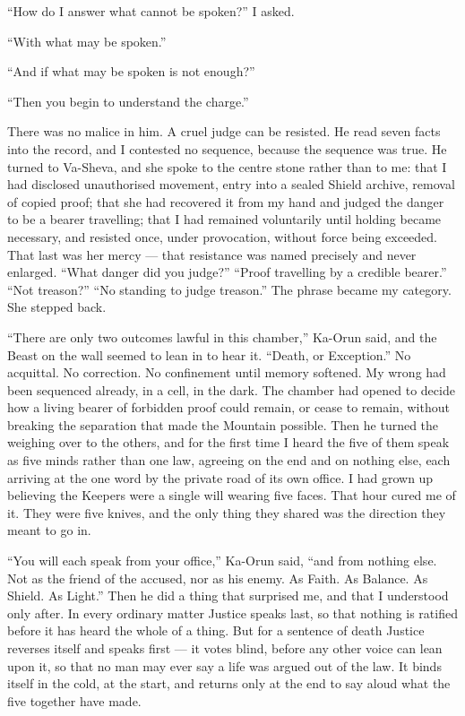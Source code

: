 ``How do I answer what cannot be spoken?'' I asked.\par
 
``With what may be spoken.''\par
 
``And if what may be spoken is not enough?''\par
 
``Then you begin to understand the charge.''\par
 
There was no malice in him. A cruel judge can be resisted. He read seven facts into the record, and I contested no sequence, because the sequence was true. He turned to Va-Sheva, and she spoke to the centre stone rather than to me: that I had disclosed unauthorised movement, entry into a sealed Shield archive, removal of copied proof; that she had recovered it from my hand and judged the danger to be a bearer travelling; that I had remained voluntarily until holding became necessary, and resisted once, under provocation, without force being exceeded. That last was her mercy --- that resistance was named precisely and never enlarged. ``What danger did you judge?'' ``Proof travelling by a credible bearer.'' ``Not treason?'' ``No standing to judge treason.'' The phrase became my category. She stepped back.\par
 
``There are only two outcomes lawful in this chamber,'' Ka-Orun said, and the Beast on the wall seemed to lean in to hear it. ``Death, or Exception.'' No acquittal. No correction. No confinement until memory softened. My wrong had been sequenced already, in a cell, in the dark. The chamber had opened to decide how a living bearer of forbidden proof could remain, or cease to remain, without breaking the separation that made the Mountain possible. Then he turned the weighing over to the others, and for the first time I heard the five of them speak as five minds rather than one law, agreeing on the end and on nothing else, each arriving at the one word by the private road of its own office. I had grown up believing the Keepers were a single will wearing five faces. That hour cured me of it. They were five knives, and the only thing they shared was the direction they meant to go in.\par

``You will each speak from your office,'' Ka-Orun said, ``and from nothing else. Not as the friend of the accused, nor as his enemy. As Faith. As Balance. As Shield. As Light.'' Then he did a thing that surprised me, and that I understood only after. In every ordinary matter Justice speaks last, so that nothing is ratified before it has heard the whole of a thing. But for a sentence of death Justice reverses itself and speaks first --- it votes blind, before any other voice can lean upon it, so that no man may ever say a life was argued out of the law. It binds itself in the cold, at the start, and returns only at the end to say aloud what the five together have made.\par

